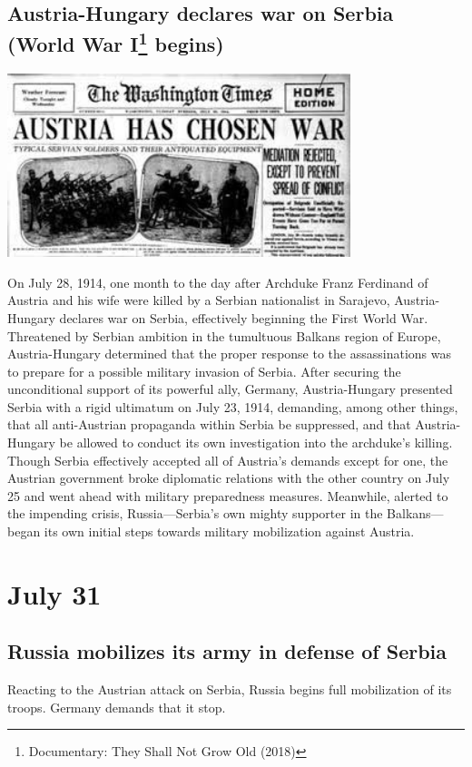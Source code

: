 \documentclass[11pt]{report}
\begin{document}
\subsection{Austria-Hungary declares war on Serbia (World War I\protect\footnote{Documentary: They Shall Not Grow Old (2018)} begins)}
\vspace{2mm}\begin{center}\includegraphics[width=10cm]{./img/austriaWarSerbia.jpg}\end{center}
On July 28, 1914, one month to the day after Archduke Franz Ferdinand of Austria and his wife were killed by a Serbian nationalist in Sarajevo, Austria-Hungary declares war on Serbia, effectively beginning the First World War.\\
Threatened by Serbian ambition in the tumultuous Balkans region of Europe, Austria-Hungary determined that the proper response to the assassinations was to prepare for a possible military invasion of Serbia. After securing the unconditional support of its powerful ally, Germany, Austria-Hungary presented Serbia with a rigid ultimatum on July 23, 1914, demanding, among other things, that all anti-Austrian propaganda within Serbia be suppressed, and that Austria-Hungary be allowed to conduct its own investigation into the archduke’s killing. Though Serbia effectively accepted all of Austria’s demands except for one, the Austrian government broke diplomatic relations with the other country on July 25 and went ahead with military preparedness measures. Meanwhile, alerted to the impending crisis, Russia—Serbia’s own mighty supporter in the Balkans—began its own initial steps towards military mobilization against Austria.
\section{July 31}
\subsection{Russia mobilizes its army in defense of Serbia}
Reacting to the Austrian attack on Serbia, Russia begins full mobilization of its troops. Germany demands that it stop.
\end{document}

